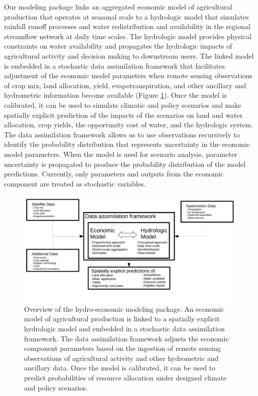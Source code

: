 Our modeling package links an aggregated economic model of agricultural production that operates at seasonal scale to a hydrologic model that simulates rainfall runoff processes and water redistribution and availability in the regional streamflow network at daily time scales. The hydrologic model provides physical constraints on water availability and propagates the hydrologic impacts of agricultural activity and decision making to downstream users. The linked model is embedded in a stochastic data assimilation framework that facilitates adjustment of the economic model parameters when remote sensing observations of crop mix, land allocation, yield, evapotranspiration, and other ancillary and hydrometric information become available (Figure \ref{fig:DAFramework}). Once the model is calibrated, it can be used to simulate climatic and policy scenarios and make spatially explicit prediction of the impacts of the scenarios on land and water allocation, crop yields, the opportunity cost of water, and the hydrologic system. The data assimilation framework allows us to use observations recursively to identify the probability distribution that represents uncertainty in the economic model parameters. When the model is used for scenario analysis, parameter uncertainty is propagated to produce the probability distribution of the model predictions. Currently, only parameters and outputs from the economic component are treated as stochastic variables. 


\begin{figure}[t]
    \centering
    \includegraphics[width=\textwidth]{Figures/DA_approach.pdf}
    \caption{Overview of the hydro-economic modeling package. An economic model of agricultural production is linked to a spatially explicit hydrologic model and embedded in a stochastic data assimilation framework. The data assimilation framework adjusts the economic component parameters based on the ingestion of remote sensing observations of agricultural activity and other hydrometric and ancillary data. Once the model is calibrated, it can be used to predict probabilities of resource allocation under designed climate and policy scenarios.}
    \label{fig:DAFramework}
\end{figure}

